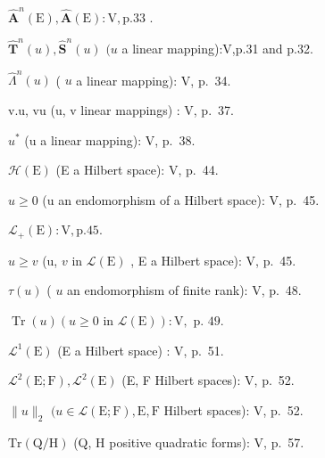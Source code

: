 \(\hat{\mathbf{A}}^{n}(\mathrm{E}), \hat{\mathbf{A}}(\mathrm{E}) : \mathrm{V}, \mathrm{p. 33}\) .

\(\hat{\mathbf{T}}^n (u),\hat{\mathbf{S}}^n (u)\) \((u\) a linear mapping):V,p.31 and p.32.

\(\hat{\Lambda}^n (u)\) ( \(u\) a linear mapping): V, p.~34.

v.u, vu (u, v linear mappings) : V, p.~37.

\(u^{*}\) (u a linear mapping): V, p.~38.

\(\mathcal{H}(\mathrm{E})\) (E a Hilbert space): V, p.~44.

\(u \geqslant 0\) (u an endomorphism of a Hilbert space): V, p.~45.

\(\mathcal{L}_{+}(\mathrm{E}):\mathrm{V},\mathrm{p.}45.\)

\(u \geqslant v\) (u, \(v\) in \(\mathcal{L}(\mathrm{E})\) , E a Hilbert space): V, p.~45.

\(\tau (u)\) ( \(u\) an endomorphism of finite rank): V, p.~48.

\(\operatorname{Tr}(u) (u \geqslant 0 \text{ in } \mathcal{L}(\mathrm{E})): \mathrm{V}, \text{ p. } 49.\)

\(\mathcal{L}^1 (\mathrm{E})\) (E a Hilbert space) : V, p.~51.

\(\mathcal{L}^2 (\mathrm{E};\mathrm{F}),\mathcal{L}^2 (\mathrm{E})\) (E, F Hilbert spaces): V, p.~52.

\(\| u\| _2\) \((u\in \mathcal{L}(\mathrm{E};\mathrm{F}),\mathrm{E},\mathrm{F}\) Hilbert spaces): V, p.~52.

\(\mathrm{Tr}(\mathrm{Q} / \mathrm{H})\) (Q, H positive quadratic forms): V, p.~57.

